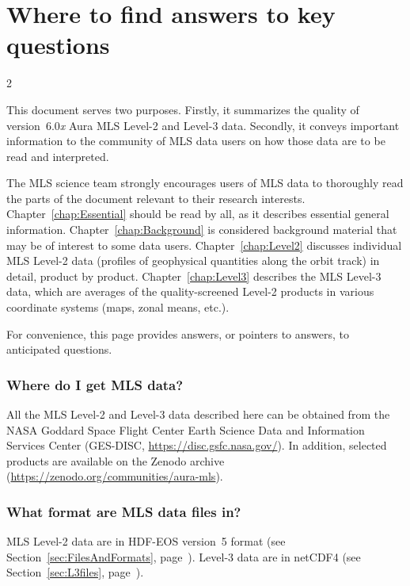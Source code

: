 \chapter*{Where to find answers to key questions}
\renewcommand{\currentnav}{Overview}
\setlength{\columnsep}{8mm}
\setlength{\columnseprule}{0.5pt}
\label{chap:Overview}

\begin{multicols}{2}

  \noindent This document serves two purposes. Firstly, it summarizes the quality of version~6.0\emph{x} Aura MLS \mbox{Level-2} and \mbox{Level-3} data. Secondly, it conveys important information to the community of MLS data users on how those data are to be read and interpreted.

  The MLS science team strongly encourages users of MLS data to thoroughly read the parts of the document relevant to their research interests. Chapter~\ref{chap:Essential} should be read by all, as it describes essential general information. Chapter~\ref{chap:Background} is considered background material that may be of interest to some data users. Chapter~\ref{chap:Level2} discusses individual MLS \mbox{Level-2} data (profiles of geophysical quantities along the orbit track) in detail, product by product.  Chapter~\ref{chap:Level3} describes the MLS \mbox{Level-3} data, which are averages of the quality-screened \mbox{Level-2} products in various coordinate systems (maps, zonal means, etc.).

  For convenience, this page provides answers, or pointers to answers, to anticipated questions.

  \subsection*{Where do I get \thisv MLS data?}
  All the MLS \mbox{Level-2} and \mbox{Level-3} data described here can be obtained from the NASA Goddard Space Flight Center Earth Science Data and Information Services Center (GES-DISC, \url{https://disc.gsfc.nasa.gov/}).  In addition, selected products are available on the Zenodo archive (\url{https://zenodo.org/communities/aura-mls}).

  \subsection*{What format are MLS data files in? }

  MLS \mbox{Level-2} data are in HDF-EOS version~5 format (see Section~\ref{sec:FilesAndFormats}, page~\pageref{sec:FilesAndFormats}). \mbox{Level-3} data are in netCDF4 (see Section~\ref{sec:L3files}, page~\pageref{sec:L3files}).


\end{multicols}
